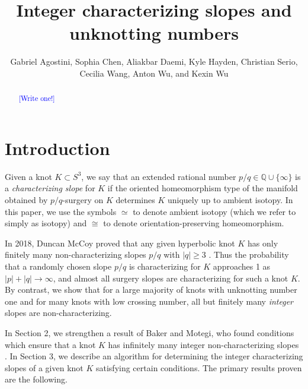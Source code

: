 \documentclass[11pt,usenames,dvipsnames,reqno]{amsart}
\numberwithin{theorem}{section}
\theoremstyle{ex}
\theoremstyle{rem}
\def\kh#1{\textcolor{Blue}{#1}}
\begin{document}


\title{Integer characterizing slopes and unknotting numbers}

\author[Agostini, Chen, Daemi, Hayden, Serio, Wang, A. Wu, and K. Wu]{Gabriel Agostini, Sophia Chen, Aliakbar Daemi, Kyle Hayden, Christian Serio, Cecilia Wang, Anton Wu, and Kexin Wu}



\begin{abstract} 
\kh{[Write one!]}
\end{abstract}


\maketitle

\section{Introduction}\label{sec:intro}

Given a knot $K\subset S^3$, we say that an extended rational number $p/q\in\mathbb{Q}\cup\{\infty\}$ is a {\it characterizing slope} for $K$ if the oriented homeomorphism type of the manifold obtained by $p/q$-surgery on $K$ determines $K$ uniquely up to ambient isotopy. In this paper, we use the symbols $\simeq$ to denote ambient isotopy (which we refer to simply as isotopy) and $\cong$ to denote orientation-preserving homeomorphism. 

In 2018, Duncan McCoy proved that any given hyperbolic knot $K$ has only finitely many non-characterizing slopes $p/q$ with $|q|\geq 3$ \cite{mccoy:hyperbolic}. Thus the probability that a randomly chosen slope $p/q$ is characterizing for $K$ approaches 1 as $|p|+|q|\to\infty$, and almost all surgery slopes are characterizing for such a knot $K$. By contrast, we show that for a large majority of knots with unknotting number one and for many knots with low crossing number, all but finitely many \textit{integer} slopes are non-characterizing.

In Section 2, we strengthen a result of Baker and Motegi, who found conditions which ensure that a knot $K$ has infinitely many integer non-characterizing slopes \cite{baker-motegi}. In Section 3, we describe an algorithm for determining the integer characterizing slopes of a given knot $K$ satisfying certain conditions. The primary results proven are the following.
\end{document}
